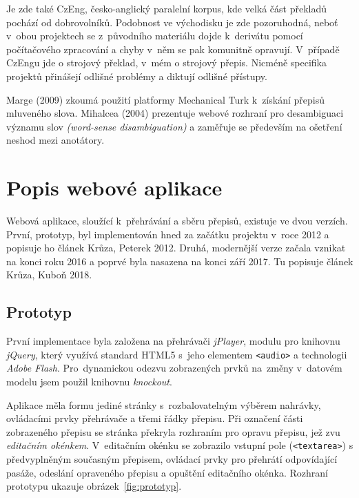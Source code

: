 Je zde také CzEng\cite{bojar2008czeng}, česko-anglický paralelní korpus, kde
velká část překladů pochází od dobrovolníků. Podobnost ve východisku je zde
pozoruhodná, neboť v~obou projektech se z~původního materiálu dojde k~derivátu
pomocí počítačového zpracování a chyby v~něm se pak komunitně opravují.
V~případě CzEngu jde o strojový překlad, v~mém o strojový přepis. Nicméně
specifika projektů přinášejí odlišné problémy a diktují odlišné přístupy.

Marge (2009)\cite{5494979} zkoumá použití platformy Mechanical Turk k~získání
přepisů mluveného slova. Mihalcea (2004)\cite{mihalcea2004building} prezentuje
webové rozhraní pro desambiguaci významu slov {\em (word-sense disambiguation)} a
zaměřuje se především na ošetření neshod mezi anotátory.

\section{Popis webové aplikace}

Webová aplikace, sloužící k~přehrávání a sběru přepisů, existuje ve dvou
verzích. První, prototyp, byl implementován hned za začátku projektu v~roce
2012 a popisuje ho článek Krůza, Peterek 2012\cite{kruuza2012making}. Druhá,
modernější verze začala vznikat na konci roku 2016 a poprvé byla nasazena na
konci září 2017. Tu popisuje článek Krůza, Kuboň
2018\cite{biblio:KrKuSecondGenerationWeb2018}.

\subsection{Prototyp}

První implementace byla založena na přehrávači \textit{jPlayer}, modulu pro
knihovnu \textit{jQuery}, který využívá standard HTML5 s~jeho elementem
\texttt{<audio>} a technologii \textit{Adobe Flash}. Pro~dynamickou odezvu
zobrazených prvků na~změny v~datovém modelu jsem použil knihovnu
\textit{knockout}.

Aplikace měla formu jediné stránky s~rozbalovatelným výběrem nahrávky,
ovládacími prvky přehrávače a třemi řádky přepisu. Při označení části
zobrazeného přepisu se stránka překryla rozhraním pro opravu přepisu, jež zvu
\textit{editačním okénkem}. V~editačním okénku se zobrazilo vstupní pole
(\texttt{<textarea>}) s předvyplněným současným přepisem, ovládací prvky pro
přehrátí odpovídající pasáže, odeslání opraveného přepisu a opuštění editačního
okénka.
Rozhraní prototypu ukazuje obrázek~\ref{fig:prototyp}.

